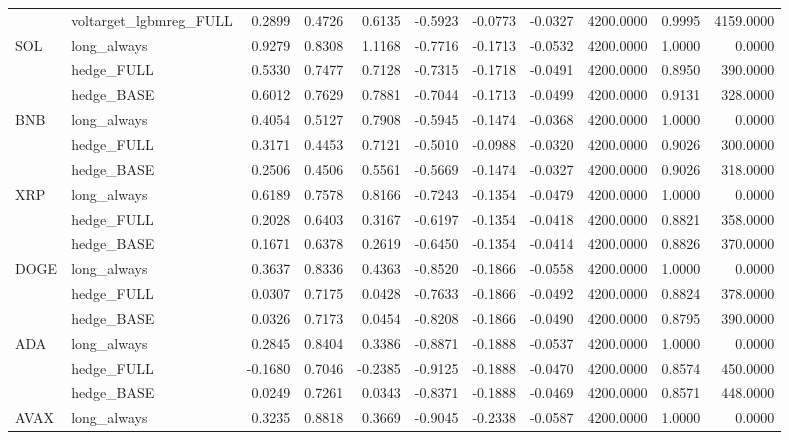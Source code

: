 \begin{tabular}{llrrrrrrrrr}
 & voltarget_lgbmreg_FULL & 0.2899 & 0.4726 & 0.6135 & -0.5923 & -0.0773 & -0.0327 & 4200.0000 & 0.9995 & 4159.0000 \\
\cline{1-11}
\multirow[t]{3}{*}{SOL} & long_always & 0.9279 & 0.8308 & 1.1168 & -0.7716 & -0.1713 & -0.0532 & 4200.0000 & 1.0000 & 0.0000 \\
 & hedge_FULL & 0.5330 & 0.7477 & 0.7128 & -0.7315 & -0.1718 & -0.0491 & 4200.0000 & 0.8950 & 390.0000 \\
 & hedge_BASE & 0.6012 & 0.7629 & 0.7881 & -0.7044 & -0.1713 & -0.0499 & 4200.0000 & 0.9131 & 328.0000 \\
\cline{1-11}
\multirow[t]{3}{*}{BNB} & long_always & 0.4054 & 0.5127 & 0.7908 & -0.5945 & -0.1474 & -0.0368 & 4200.0000 & 1.0000 & 0.0000 \\
 & hedge_FULL & 0.3171 & 0.4453 & 0.7121 & -0.5010 & -0.0988 & -0.0320 & 4200.0000 & 0.9026 & 300.0000 \\
 & hedge_BASE & 0.2506 & 0.4506 & 0.5561 & -0.5669 & -0.1474 & -0.0327 & 4200.0000 & 0.9026 & 318.0000 \\
\cline{1-11}
\multirow[t]{3}{*}{XRP} & long_always & 0.6189 & 0.7578 & 0.8166 & -0.7243 & -0.1354 & -0.0479 & 4200.0000 & 1.0000 & 0.0000 \\
 & hedge_FULL & 0.2028 & 0.6403 & 0.3167 & -0.6197 & -0.1354 & -0.0418 & 4200.0000 & 0.8821 & 358.0000 \\
 & hedge_BASE & 0.1671 & 0.6378 & 0.2619 & -0.6450 & -0.1354 & -0.0414 & 4200.0000 & 0.8826 & 370.0000 \\
\cline{1-11}
\multirow[t]{3}{*}{DOGE} & long_always & 0.3637 & 0.8336 & 0.4363 & -0.8520 & -0.1866 & -0.0558 & 4200.0000 & 1.0000 & 0.0000 \\
 & hedge_FULL & 0.0307 & 0.7175 & 0.0428 & -0.7633 & -0.1866 & -0.0492 & 4200.0000 & 0.8824 & 378.0000 \\
 & hedge_BASE & 0.0326 & 0.7173 & 0.0454 & -0.8208 & -0.1866 & -0.0490 & 4200.0000 & 0.8795 & 390.0000 \\
\cline{1-11}
\multirow[t]{3}{*}{ADA} & long_always & 0.2845 & 0.8404 & 0.3386 & -0.8871 & -0.1888 & -0.0537 & 4200.0000 & 1.0000 & 0.0000 \\
 & hedge_FULL & -0.1680 & 0.7046 & -0.2385 & -0.9125 & -0.1888 & -0.0470 & 4200.0000 & 0.8574 & 450.0000 \\
 & hedge_BASE & 0.0249 & 0.7261 & 0.0343 & -0.8371 & -0.1888 & -0.0469 & 4200.0000 & 0.8571 & 448.0000 \\
\cline{1-11}
\multirow[t]{3}{*}{AVAX} & long_always & 0.3235 & 0.8818 & 0.3669 & -0.9045 & -0.2338 & -0.0587 & 4200.0000 & 1.0000 & 0.0000 \\

\end{tabular}
